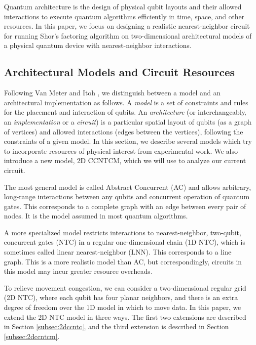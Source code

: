 \documentclass[twoside]{article}
\begin{document}
Quantum architecture is the design of physical qubit layouts
and their allowed interactions to execute
quantum algorithms efficiently in time, space, and other
resources.
In this paper, we focus on designing a realistic nearest-neighbor circuit for running
Shor's factoring algorithm on two-dimensional
architectural models of a physical quantum device with nearest-neighbor
interactions.

\subsection{Architectural Models and Circuit Resources}
\label{subsec:models}

Following Van Meter and Itoh \cite{VanMeter2005},
we distinguish between a model and an architectural implementation as follows.
A \emph{model} is a set of constraints and rules for the placement and
interaction of qubits.
An \emph{architecture} (or interchangeably, an \emph{implementation} 
or a \emph{circuit}) is a particular
spatial layout of qubits (as a graph of vertices) and allowed interactions (edges between the vertices),
following the constraints of a given model. In this section, we describe
several models which try to incorporate resources of physical interest from
experimental work. We also introduce a new model,
\textsc{2D CCNTCM}, which we will use to analyze our current circuit.

The most general model is called Abstract Concurrent (\textsc{AC})
and allows arbitrary, long-range interactions between any qubits and concurrent
operation of quantum gates.
This corresponds to a complete graph with an edge between every pair of nodes.
It is the model assumed in most quantum algorithms.

A more specialized model restricts interactions to nearest-neighbor, two-qubit,
concurrent gates (\textsc{NTC}) in a regular one-dimensional chain (1D NTC),
which is sometimes called linear nearest-neighbor (\textsc{LNN}).
This corresponds to a line graph. This is a more realistic model than
\textsc{AC}, but correspondingly, circuits in this model may incur greater
resource overheads.

To relieve movement congestion,
we can consider a two-dimensional regular grid
(2D NTC), where each
qubit has four planar neighbors, and 
there is an extra degree of freedom over the 1D model
in which to move data.
In this paper, we extend the \textsc{2D NTC} model in three ways.
The first two extensions are described in Section \ref{subsec:2dccntc},
and the third extension is described in Section \ref{subsec:2dccntcm}.
\end{document}
